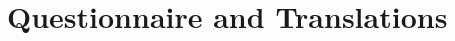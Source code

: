 \documentclass[11pt, ngerman,english,a4]{article}
\begin{document}
\clearpage




\section*{Questionnaire and Translations}











\end{document}
